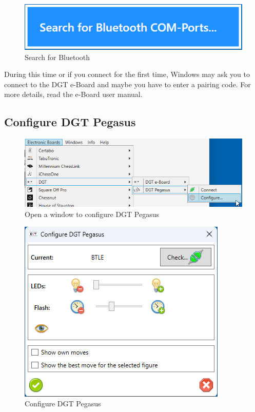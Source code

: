 \documentclass[11pt,a4paper]{article}
\begin{document}
\begin{figure}[H]
	\centering
	\includegraphics[scale=0.8]{MillenniumChessLink10.png}
	\caption{Search for Bluetooth}
	\label{fig:DGTEBoardBT}
\end{figure}

During this time or if you connect for the first time, Windows may ask you to connect to the DGT e-Board and maybe you have to enter a pairing code. For more details, read the e-Board user manual.\\


\subsection{Configure DGT Pegasus} \label{ConfigurePegasus}
\begin{figure}[H]
	\centering
	\includegraphics[scale=0.8]{Pegasus1.png}
	\caption{Open a window to configure DGT Pegasus}
	\label{fig:Pegasus1}
\end{figure}

\begin{figure}[H]
	\centering
	\includegraphics[scale=1.0]{Pegasus6.png}
	\caption{Configure DGT Pegasus}
	\label{fig:Pegasus6}
\end{figure}
\end{document}
